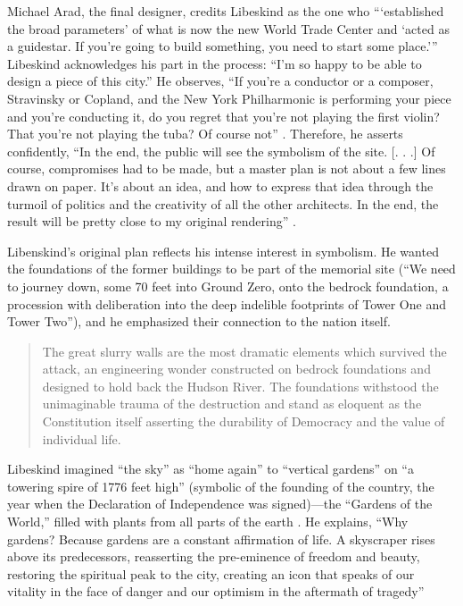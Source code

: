 Michael Arad, the final designer, credits Libeskind as
the one who “‘established the broad parameters’ of what is now the new
World Trade Center and ‘acted as a guidestar.  If
you're going to build something,
you need to start some place.’”  Libeskind acknowledges his part in the
process: ``I'm so happy to be able to
design a piece of this city.''  He observes,
``If you're a conductor or a composer,
Stravinsky or Copland, and the New York Philharmonic is performing your
piece and you're conducting it, do you regret that
you're not playing the first violin?  That
you're not playing the tuba?  Of course not'' \citep{huffpost2012}.
Therefore, he
asserts confidently, “In the end, the public will see the symbolism of
the site.  [. . .] Of course, compromises had to be made, but a master
plan is not about a few lines drawn on paper.  It’s about an idea, and
how to express that idea through the turmoil of politics and the
creativity of all the other architects.  In the end, the result will be
pretty close to my original rendering” \citep{davidson2007}.

Libenskind’s
original plan reflects his intense interest in symbolism.  He wanted
the foundations of the former buildings to be part of the memorial site
(“We need to journey down, some 70 feet into Ground Zero, onto the
bedrock foundation, a procession with deliberation into the deep
indelible footprints of Tower One and Tower Two”),
and he emphasized
their connection to the nation itself. 

\begin{quote}
The great slurry walls are the most dramatic elements which survived the
attack, an engineering wonder constructed on bedrock foundations and
designed to hold back the Hudson River.  The foundations withstood the
unimaginable trauma of the destruction and stand as eloquent as the
Constitution itself asserting the durability of Democracy and the value
of individual life.\citep{libeskind2012}
\end{quote}

Libeskind imagined “the sky” as “home again” to “vertical gardens” on “a
towering spire of 1776 feet high” (symbolic of the founding of the
country, the year when the Declaration of Independence was signed)—the
“Gardens of the World,” filled with plants from all parts of the earth
 \citep{libeskind2012}\citep{ny1news2003}\citep{nessen2011}.
He explains, “Why gardens?  Because gardens are a constant affirmation of
life.  A skyscraper rises above its predecessors, reasserting the
pre-eminence of freedom and beauty, restoring the spiritual peak to the
city, creating an icon that speaks of our vitality in the face of
danger and our optimism in the aftermath of tragedy” \citep{libeskind2012}

